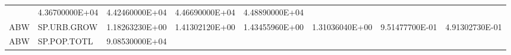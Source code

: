 \documentclass[]{article}
\begin{document}
\begin{longtable}[]{@{}llrrrrrr@{}}
\begin{minipage}[t]{0.11\columnwidth}
\end{minipage} & \begin{minipage}[t]{0.11\columnwidth}\raggedleft\strut
4.36700000E+04\strut
\end{minipage} & \begin{minipage}[t]{0.11\columnwidth}\raggedleft\strut
4.42460000E+04\strut
\end{minipage} & \begin{minipage}[t]{0.11\columnwidth}\raggedleft\strut
4.46690000E+04\strut
\end{minipage} & \begin{minipage}[t]{0.11\columnwidth}\raggedleft\strut
4.48890000E+04\strut
\end{minipage}\tabularnewline
\begin{minipage}[t]{0.06\columnwidth}\raggedright\strut
ABW\strut
\end{minipage} & \begin{minipage}[t]{0.08\columnwidth}\raggedright\strut
SP.URB.GROW\strut
\end{minipage} & \begin{minipage}[t]{0.11\columnwidth}\raggedleft\strut
1.18263230E+00\strut
\end{minipage} & \begin{minipage}[t]{0.11\columnwidth}\raggedleft\strut
1.41302120E+00\strut
\end{minipage} & \begin{minipage}[t]{0.11\columnwidth}\raggedleft\strut
1.43455960E+00\strut
\end{minipage} & \begin{minipage}[t]{0.11\columnwidth}\raggedleft\strut
1.31036040E+00\strut
\end{minipage} & \begin{minipage}[t]{0.11\columnwidth}\raggedleft\strut
9.51477700E-01\strut
\end{minipage} & \begin{minipage}[t]{0.11\columnwidth}\raggedleft\strut
4.91302730E-01\strut
\end{minipage}\tabularnewline
\begin{minipage}[t]{0.06\columnwidth}\raggedright\strut
ABW\strut
\end{minipage} & \begin{minipage}[t]{0.08\columnwidth}\raggedright\strut
SP.POP.TOTL\strut
\end{minipage} & \begin{minipage}[t]{0.11\columnwidth}\raggedleft\strut
9.08530000E+04\strut
\end{minipage} & \begin{minipage}[t]{0.11\columnwidth}\raggedleft\strut

\end{minipage}
\end{longtable}
\end{document}
